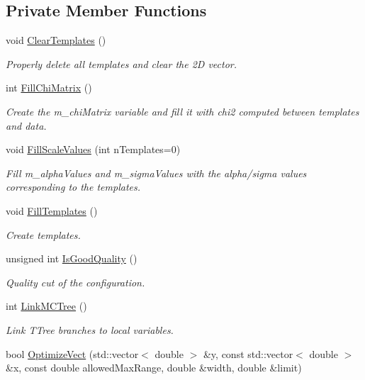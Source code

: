 \subsection*{Private Member Functions}
\begin{DoxyCompactItemize}
\item 
void \hyperlink{classTemplateMethod_1_1ChiMatrix_a0a615698ab9e4a1deae77de9d50e14e5}{Clear\+Templates} ()
\begin{DoxyCompactList}\small\item\em Properly delete all templates and clear the 2\+D vector. \end{DoxyCompactList}\item 
int \hyperlink{classTemplateMethod_1_1ChiMatrix_ab64ef0c92de0ba7847345bbf391d87f8}{Fill\+Chi\+Matrix} ()
\begin{DoxyCompactList}\small\item\em Create the m\+\_\+chi\+Matrix variable and fill it with chi2 computed between templates and data. \end{DoxyCompactList}\item 
void \hyperlink{classTemplateMethod_1_1ChiMatrix_ae8fb4f2779aca62b23c1df352452718c}{Fill\+Scale\+Values} (int n\+Templates=0)
\begin{DoxyCompactList}\small\item\em Fill m\+\_\+alpha\+Values and m\+\_\+sigma\+Values with the alpha/sigma values corresponding to the templates. \end{DoxyCompactList}\item 
void \hyperlink{classTemplateMethod_1_1ChiMatrix_a5e505c5eed86b42d40737a21cdb614f1}{Fill\+Templates} ()
\begin{DoxyCompactList}\small\item\em Create templates. \end{DoxyCompactList}\item 
unsigned int \hyperlink{classTemplateMethod_1_1ChiMatrix_a75f783b6d24448098ec2dfef19dc3acb}{Is\+Good\+Quality} ()
\begin{DoxyCompactList}\small\item\em Quality cut of the configuration. \end{DoxyCompactList}\item 
int \hyperlink{classTemplateMethod_1_1ChiMatrix_a8af2ad73d3cab66503200dd711223cc2}{Link\+M\+C\+Tree} ()
\begin{DoxyCompactList}\small\item\em Link T\+Tree branches to local variables. \end{DoxyCompactList}\item 
bool \hyperlink{classTemplateMethod_1_1ChiMatrix_acd1218a92d64ad5a1b741f20cc594616}{Optimize\+Vect} (std\+::vector$<$ double $>$ \&y, const std\+::vector$<$ double $>$ \&x, const double allowed\+Max\+Range, double \&width, double \&limit)
\end{DoxyCompactItemize}
